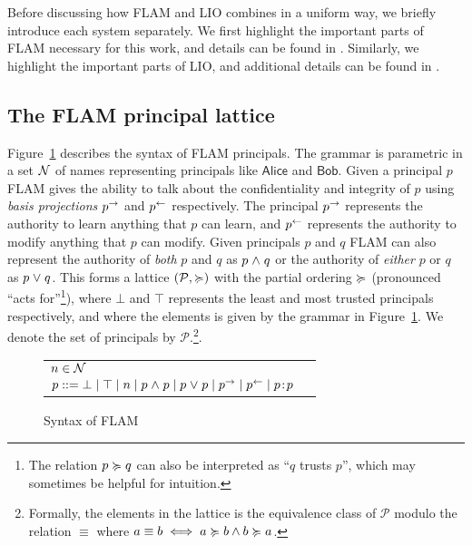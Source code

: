 Before discussing how FLAM and LIO combines in a uniform way, we briefly introduce each system separately. We first highlight the important parts of FLAM necessary for this work, and details can be found in \cite{Arden:2015:FA:2859845.2859998}. Similarly, we highlight the important parts of LIO, and additional details can be found in \cite{SRMMlio}.

\subsection{The FLAM principal lattice}
Figure~\ref{fig:flam-syntax} describes the syntax of FLAM principals. The grammar is parametric in a set $\mathcal{N}$ of names representing principals like $\mathsf{Alice}$ and $\mathsf{Bob}$. Given a principal $p$ FLAM gives the ability to talk about the confidentiality and integrity of $p$ using \emph{basis projections} $p^{\rightarrow}$ and $p^{\leftarrow}$ respectively. The principal $p^{\rightarrow}$ represents the authority to learn anything that $p$ can learn, and $p^{\leftarrow}$ represents the authority to modify anything that $p$ can modify. Given principals $p$ and $q$ FLAM can also represent the authority of \emph{both} $p$ and $q$ as $p \mathrel{\land} q$ or the authority of \emph{either} $p$ or $q$ as $p \mathrel{\lor} q$. This forms a lattice $(\mathcal{P}, \succcurlyeq)$ with the partial ordering $\succcurlyeq$ (pronounced ``acts for''\footnote{The relation $p \succcurlyeq q$ can also be interpreted as ``$q$ trusts $p$'', which may sometimes be helpful for intuition.}), where $\bot$ and $\top$ represents the least and most trusted principals respectively, and where the elements is given by the grammar in Figure~\ref{fig:flam-syntax}. We denote the set of principals by $\mathcal{P}$.\footnote{Formally, the elements in the lattice is the equivalence class of $\mathcal{P}$ modulo the relation $\equiv$ where $a \equiv b \iff a \succcurlyeq b \wedge b \succcurlyeq a$.}.

\begin{figure}
    \centering
    \begin{tabular}{ll}
    $n \in \mathcal{N}$ \\
    $p ::= \bot \mid \top \mid n \mid p \mathrel{\land} p \mid p \mathrel{\lor} p \mid p^{\rightarrow} \mid p^{\leftarrow} \mid p\!:\!p$
    \end{tabular}
    \caption{Syntax of FLAM}
    \label{fig:flam-syntax}
\end{figure}

